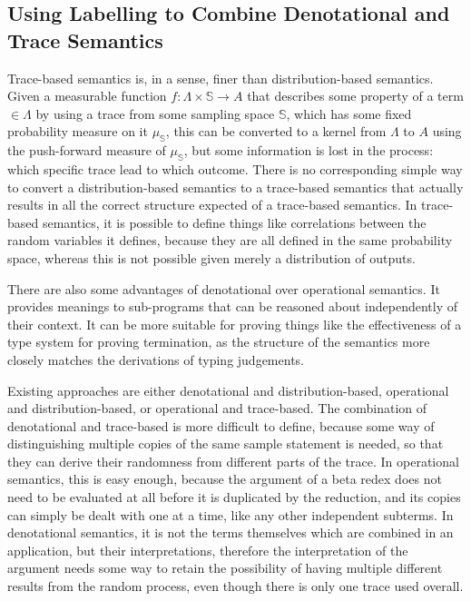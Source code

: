 \documentclass[titlepage]{article}
\begin{document}
\subsection{Using Labelling to Combine Denotational and Trace Semantics}
Trace-based semantics is, in a sense, finer than distribution-based semantics. Given a measurable function $f : \Lambda \times \mathbb S \to A$ that describes some property of a term $\in \Lambda$ by using a trace from some sampling space $\mathbb S$, which has some fixed probability measure on it $\mu_{\mathbb S}$, this can be converted to a kernel from $\Lambda$ to $A$ using the push-forward measure of $\mu_{\mathbb S}$, but some information is lost in the process: which specific trace lead to which outcome. There is no corresponding simple way to convert a distribution-based semantics to a trace-based semantics that actually results in all the correct structure expected of a trace-based semantics. In trace-based semantics, it is possible to define things like correlations between the random variables it defines, because they are all defined in the same probability space, whereas this is not possible given merely a distribution of outputs.

There are also some advantages of denotational over operational semantics. It provides meanings to sub-programs that can be reasoned about independently of their context. It can be more suitable for proving things like the effectiveness of a type system for proving termination, as the structure of the semantics more closely matches the derivations of typing judgements.%

Existing approaches are either denotational and distribution-based, operational and distribution-based, or operational and trace-based. The combination of denotational and trace-based is more difficult to define, because some way of distinguishing multiple copies of the same sample statement is needed, so that they can derive their randomness from different parts of the trace. In operational semantics, this is easy enough, because the argument of a beta redex does not need to be evaluated at all before it is duplicated by the reduction, and its copies can simply be dealt with one at a time, like any other independent subterms. In denotational semantics, it is not the terms themselves which are combined in an application, but their interpretations, therefore the interpretation of the argument needs some way to retain the possibility of having multiple different results from the random process, even though there is only one trace used overall.
\end{document}
